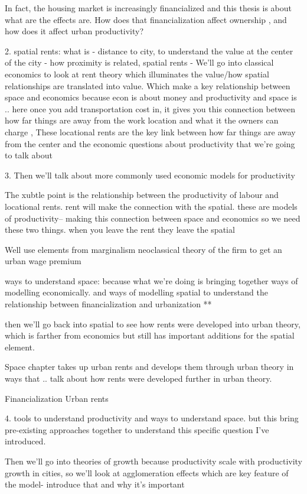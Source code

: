 In fact, the housing market is increasingly financialized and this thesis is about what are the effects are. How does that financialization affect ownership , and how does it affect urban productivity?

2. spatial rents: what is - distance to city, to understand the value at the center of the city - how proximity is related, spatial rents - We'll go into classical economics to look at rent theory which illuminates the value/how spatial relationships are translated into value. Which make a key relationship between space and economics because econ is about money and productivity and space is .. here once you add transportation cost in, it gives you this connection between how far things are away from the work location and what it the owners can charge , These locational rents are the key link between how far things are away from the center and the economic questions about productivity  that we're going to talk about

3. Then we'll talk about more commonly used economic models for productivity

The xubtle point is the relationship between the productivity of labour and locational rents.
rent will make the connection with the spatial. 
these are models of productivity-- making this connection between space and economics so we need these two things.
when you leave the rent they leave the spatial

Well use elements from marginalism neoclassical theory of the firm to get an urban wage premium

 ways to understand space: because what we’re doing is bringing together ways of modelling economically. and ways of modelling spatial to understand the relationship between financialization and urbanization **
 
then we'll go back into spatial to see how rents were developed into urban theory, which is farther from economics but still has important additions for the spatial element. 

Space chapter takes up urban rents and develops them through urban theory in ways that .. talk about how rents were developed further in urban theory.

Financialization
Urban rents

4. tools to understand productivity and ways to understand space. but this bring pre-existing approaches together to understand this specific question I've introduced.


Then we'll go into theories of growth because productivity scale with productivity growth in cities, so we'll look at agglomeration effects which are key feature of the model- introduce that and why it's important

